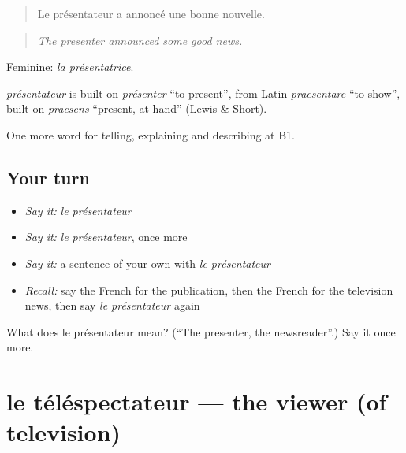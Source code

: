 \begin{quote}
Le présentateur a annoncé une bonne nouvelle.
\end{quote}

\begin{quote}
\emph{The presenter announced some good news.}
\end{quote}

Feminine: \emph{la présentatrice}.

\begin{cousinweb}
\emph{présentateur} is built on \emph{présenter} \textquotedblleft{}to present\textquotedblright{}, from Latin \emph{praesentāre} \textquotedblleft{}to show\textquotedblright{}, built on \emph{praesēns} \textquotedblleft{}present, at hand\textquotedblright{} (Lewis \& Short).
\end{cousinweb}

\begin{grammarlens}[title={What you've built}]
One more word for telling, explaining and describing at B1.
\end{grammarlens}

\subsection*{Your turn}
\begin{itemize}
\raggedright
  \item \emph{Say it:} \emph{le présentateur}
  \item \emph{Say it:} \emph{le présentateur}, once more
  \item \emph{Say it:} a sentence of your own with \emph{le présentateur}
  \item \emph{Recall:} say the French for the publication, then the French for the television news, then say \emph{le présentateur} again
\end{itemize}

\begin{tcolorbox}[breakable,colback=teal!4,colframe=teal!35!black,title={Before you move on}]
What does le présentateur mean? (\textquotedblleft{}The presenter, the newsreader\textquotedblright{}.) Say it once more.
\end{tcolorbox}
\section[le téléspectateur]{le téléspectateur — the viewer (of television)}

\label{lesson:FR-C280-telespectateur}



